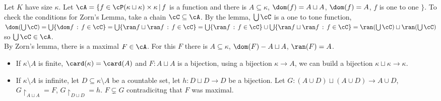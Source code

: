 \begin{pf}
    Let $K$ have size $\kappa$. Let $\cA = \{ f \in \cP(\kappa \sqcup \kappa) \times \kappa \, | \, f$ is a function and there is $A \subseteq \kappa$, $\dom(f) = A \sqcup A$, $\dom(f) = A$, $f$ is one to one $\}$. To check the conditions for Zorn's Lemma, take a chain $\cC \subseteq \cA$. By the lemma, $\bigcup \cC$ is a one to tone function, $\dom(\bigcup \cC) = \bigcup \{ \dom f \, : \, f \in \cC\} = \bigcup \{\ran f \sqcup \ran f \, : \, f \in \cC\} = \bigcup \{ \ran f \, : \, f \in \cC\} \cup \bigcup \{\ran f \sqcup \ran f \, : \, f \in \cC\} = \ran(\bigcup \cC) \sqcup \ran(\bigcup \cC)$ so $\bigcup \cC \in \cA$. \\
    By Zorn's lemma, there is a maximal $F \in \cA$. For this $F$ there is $A \subseteq \kappa$, $\dom (F) - A \sqcup A$, $\ran(F) = A$. 
    \begin{itemize}
        \item If $\kappa \setminus A$ is finite, $\card(\kappa) = \card(A)$ and $F: A \sqcup A$ is a bijection, using a bijection $\kappa \to A$, we can build a bijection $\kappa \sqcup \kappa \to \kappa$. 
        \item If $\kappa \setminus A$ is infinite, let $D \subseteq \kappa \setminus A$ be a countable set, let $h: D \sqcup D \to D$ be a bijection. Let $G: (A \cup D) \sqcup (A \cup D) \to A \cup D$, $G \upharpoonright_{A \sqcup A} = F$, $G \upharpoonright_{D \sqcup D} = h$. $F \subsetneq G$ contradicitng that $F$ was maximal. 
    \end{itemize}
\end{pf}


